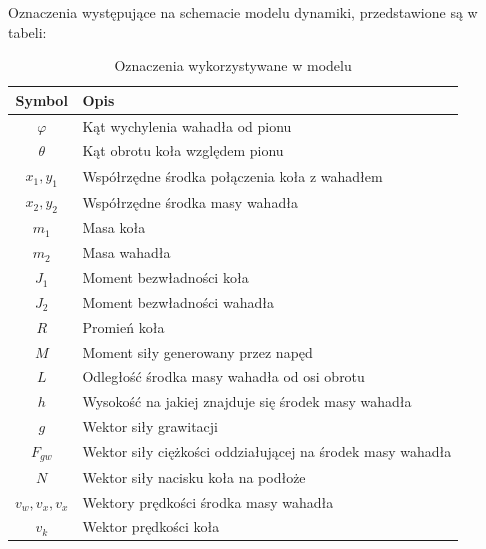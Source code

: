 Oznaczenia występujące na schemacie modelu dynamiki, przedstawione są w tabeli:
    \begin{table}[h!]
        \centering
        \caption{Oznaczenia wykorzystywane w modelu}
        \label{Oznaczenia}
        \begin{tabular}{|c|l|}
              \hline
              Symbol & Opis\\
              \hline
              $\varphi$ & Kąt wychylenia wahadła od pionu \\
              \hline
              $\theta$ & Kąt obrotu koła względem pionu \\
              \hline
              $x_1, y_1$ & Współrzędne środka połączenia koła z wahadłem \\
              \hline
              $x_2, y_2$ & Współrzędne środka masy wahadła \\
              \hline
              $m_1$ & Masa koła \\
              \hline
              $m_2$ & Masa wahadła \\
              \hline
              $J_1$ & Moment bezwładności koła \\
              \hline
              $J_2$ & Moment bezwładności wahadła \\
              \hline
              $R$ & Promień koła \\
              \hline
              $M$ & Moment siły generowany przez napęd\\
              \hline
              $L$ & Odległość środka masy wahadła od osi obrotu \\
              \hline
              $h$ & Wysokość na jakiej znajduje się środek masy wahadła \\
              \hline
              $g$ & Wektor siły grawitacji \\
              \hline
              $F_{gw}$ & Wektor siły ciężkości oddziałującej na środek masy wahadła \\
              \hline
              $N$ & Wektor siły nacisku koła na podłoże \\
              \hline
              $v_w, v_x, v_x $ & Wektory prędkości środka masy wahadła \\
              \hline
              $v_k$ & Wektor prędkości koła \\
              \hline
        \end{tabular}
    \end{table}
    	
